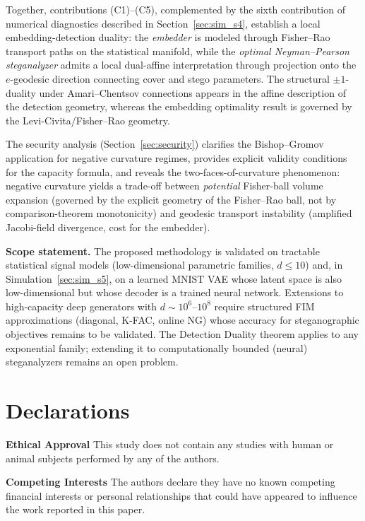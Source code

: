 \documentclass[a4paper,fleqn]{cas-dc}
\begin{document}
Together, contributions (C1)--(C5), complemented by the sixth
contribution of numerical diagnostics described in Section~\ref{sec:sim_s4}, establish a local embedding-detection
duality:
the \emph{embedder} is modeled through Fisher--Rao transport paths on the
statistical manifold, while the \emph{optimal Neyman--Pearson steganalyzer}
admits a local dual-affine interpretation through projection onto the
$e$-geodesic direction connecting cover and stego parameters. The
structural $\pm1$-duality under Amari--Chentsov connections appears in the
affine description of the detection geometry, whereas the embedding
optimality result is governed by the Levi-Civita/Fisher--Rao geometry.

The security analysis (Section~\ref{sec:security}) clarifies the
Bishop--Gromov application for negative curvature regimes, provides
explicit validity conditions for the capacity formula, and reveals the
two-faces-of-curvature phenomenon: negative curvature yields a trade-off
between \emph{potential} Fisher-ball volume expansion (governed by the explicit
geometry of the Fisher--Rao ball, not by comparison-theorem monotonicity)
and geodesic transport instability (amplified Jacobi-field divergence,
cost for the embedder).

\textbf{Scope statement.}
The proposed methodology is validated on tractable statistical signal
models (low-dimensional parametric families, $d \leq 10$) and, in
Simulation~\ref{sec:sim_s5}, on a learned MNIST VAE whose latent space is
also low-dimensional but whose decoder is a trained neural network.
Extensions to high-capacity deep generators with $d \sim 10^6$--$10^8$
require structured FIM approximations (diagonal, K-FAC, online NG) whose
accuracy for steganographic objectives remains to be validated.
The Detection Duality theorem applies to any exponential family;
extending it to computationally bounded (neural) steganalyzers remains
an open problem.


\section*{Declarations}
\begin{sloppypar}
\textbf{Ethical Approval} This study does not contain any studies with
human or animal subjects performed by any of the authors.
\end{sloppypar}

\noindent
\begin{sloppypar}
\textbf{Competing Interests} The authors declare they have no known
competing financial interests or personal relationships that could have
appeared to influence the work reported in this paper.
\end{sloppypar}
\end{document}
